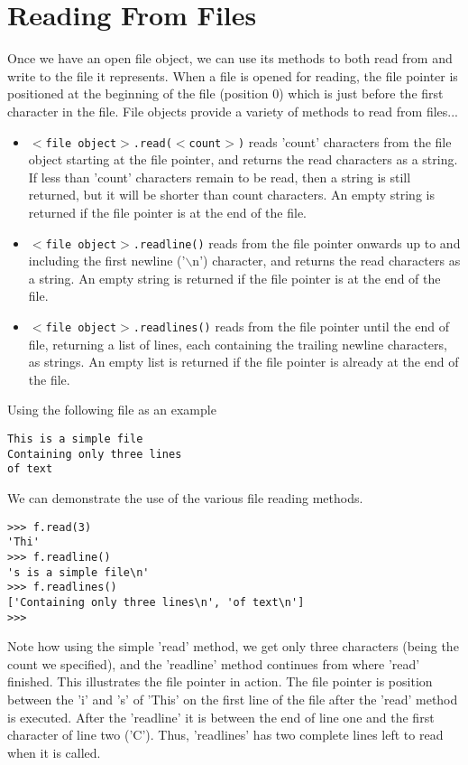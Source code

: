 \documentclass[a4paper,11pt]{article}
\begin{document}
\section{Reading From Files}

Once we have an open file object, we can use its methods to both   read from and write to the file it represents. When a file is opened   for reading, the file pointer is positioned at the beginning of the   file (position 0) which is just before the first character in the file.   File objects provide a variety of methods to read from files...
\begin{itemize}
	\item 
\texttt{$<$file object$>$.read($<$count$>$)} reads    'count' characters from the file object starting at the file    pointer, and returns the read characters as a string. If less than    'count' characters remain to be read, then a string is still    returned, but it will be shorter than count characters. An empty    string is returned if the file pointer is at the end of the    file.
	\item 
\texttt{$<$file object$>$.readline()} reads from the file    pointer onwards up to and including the first newline ('$\backslash$n')    character, and returns the read characters as a string. An empty    string is returned if the file pointer is at the end of the    file.
	\item 
\texttt{$<$file object$>$.readlines()} reads from the    file pointer until the end of file, returning a list of lines, each    containing the trailing newline characters, as strings. An empty    list is returned if the file pointer is already at the end of the    file.
\end{itemize}

Using the following file as an example
\begin{lstlisting}
This is a simple file
Containing only three lines
of text\end{lstlisting}

We can demonstrate the use of the various file reading methods.
\begin{lstlisting}
>>> f.read(3)
'Thi'
>>> f.readline()
's is a simple file\n'
>>> f.readlines()
['Containing only three lines\n', 'of text\n']
>>>\end{lstlisting}

Note how using the simple 'read' method, we get only three   characters (being the count we specified), and the 'readline' method   continues from where 'read' finished. This illustrates the file pointer   in action. The file pointer is position between the 'i' and 's' of   'This' on the first line of the file after the 'read' method is   executed. After the 'readline' it is between the end of line one and   the first character of line two ('C'). Thus, 'readlines' has two   complete lines left to read when it is called.
\end{document}
